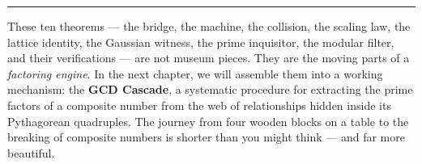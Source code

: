 \bigskip\noindent\rule{\linewidth}{0.4pt}\bigskip

These ten theorems --- the bridge, the machine, the collision, the scaling law, the lattice identity, the Gaussian witness, the prime inquisitor, the modular filter, and their verifications --- are not museum pieces. They are the moving parts of a \emph{factoring engine}. In the next chapter, we will assemble them into a working mechanism: the \textbf{GCD Cascade}, a systematic procedure for extracting the prime factors of a composite number from the web of relationships hidden inside its Pythagorean quadruples. The journey from four wooden blocks on a table to the breaking of composite numbers is shorter than you might think --- and far more beautiful.
